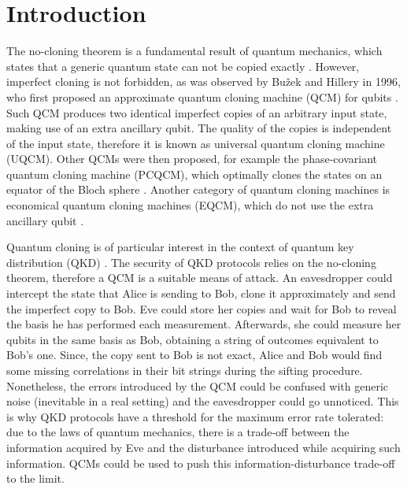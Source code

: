 \chapter{Introduction}
\label{sec:introduction}
The no-cloning theorem is a fundamental result of quantum mechanics, which states that a generic quantum state can not be copied exactly \cite{Wootters1982}.
However, imperfect cloning is not forbidden, as was observed by Bu\ifmmode {}\else \v{z}\fi{}ek and Hillery in 1996,
who first proposed an approximate quantum cloning machine (QCM) for qubits \cite{Buzek1996}.
Such QCM produces two identical imperfect copies of an arbitrary input state, making use of an extra ancillary qubit. 
The quality of the copies is independent of the input state, therefore it is known as universal quantum cloning machine (UQCM).
Other QCMs were then proposed, for example the phase-covariant quantum cloning machine (PCQCM), 
which optimally clones the states on an equator of the Bloch sphere \cite{PhaseCovariantOptimalBruss}.
Another category of quantum cloning machines is economical quantum cloning machines (EQCM), which do not use the extra ancillary qubit \cite{EconomicalNiuGriffiths}. 

Quantum cloning is of particular interest in the context of quantum key distribution (QKD) \cite{QuantumCloningReviewScarani}. 
The security of QKD protocols relies on the no-cloning theorem, therefore a QCM is a suitable means of attack.
An eavesdropper could intercept the state that Alice is sending to Bob, clone it approximately and send the imperfect copy to Bob.
Eve could store her copies and wait for Bob to reveal the basis he has performed each measurement. 
Afterwards, she could measure her qubits in the same basis as Bob, obtaining a string of outcomes equivalent to Bob's one.
Since, the copy sent to Bob is not exact, Alice and Bob would find some missing correlations in their bit strings during the sifting procedure.
Nonetheless, the errors introduced by the QCM could be confused with generic noise (inevitable in a real setting) and the eavesdropper could go unnoticed.
This is why QKD protocols have a threshold for the maximum error rate tolerated: due to the laws of quantum mechanics, there is a trade-off between the information acquired by Eve and the disturbance introduced while acquiring such information.
QCMs could be used to push this information-disturbance trade-off to the limit.

